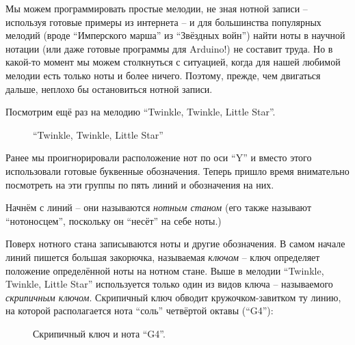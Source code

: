 \documentclass[a4paper,twoside]{book}
\newcounter{example-counter}
\begin{document}
Мы можем программировать простые мелодии, не зная нотной записи -- используя
готовые примеры из интернета -- и для большинства популярных мелодий (вроде
``Имперского марша'' из ``Звёздных войн'') найти ноты в научной нотации (или даже
готовые программы для Arduino!) не составит труда. Но в какой-то момент мы можем
столкнуться с ситуацией, когда для нашей любимой мелодии есть только ноты и
более ничего. Поэтому, прежде, чем двигаться дальше, неплохо бы остановиться
нотной записи.

Посмотрим ещё раз на мелодию ``Twinkle, Twinkle, Little Star''.

\begin{figure}[ht]
  \caption{``Twinkle, Twinkle, Little Star''}
  \centering
  \label{fig:sound-fig-4}
\end{figure}

Ранее мы проигнорировали расположение нот по оси ``Y'' и вместо этого
использовали готовые буквенные обозначения. Теперь пришло время внимательно
посмотреть на эти группы по пять линий и обозначения на них.

Начнём с линий -- они называются \emph{нотным станом} (его также называют
``нотоносцем'', поскольку он ``несёт'' на себе ноты.)

Поверх нотного стана записываются ноты и другие обозначения. В самом начале
линий пишется большая закорючка, называемая \emph{ключом} -- ключ определяет
положение определённой ноты на нотном стане. Выше в мелодии ``Twinkle, Twinkle,
Little Star'' используется только один из видов ключа -- называемого
\emph{скрипичным ключом}. Скрипичный ключ обводит кружочком-завитком ту линию,
на которой располагается нота ``соль'' четвёртой октавы (``G4''):

\begin{figure}[ht]
  \caption{Скрипичный ключ и нота ``G4''.}
  \centering
  \label{fig:lilypond-clef-example}
\end{figure}
\end{document}

